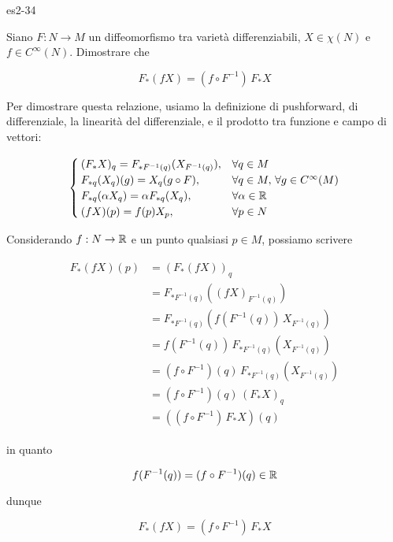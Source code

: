 {es2-34}
{
Siano $ F : N \to M $ un diffeomorfismo tra varietà differenziabili, $ X \in \chi(N) $ e $ f \in C^{\infty}(N) $. Dimostrare che

\begin{equation}
	F_{*}(f X) = (f \circ F^{-1}) \, F_{*} X
\end{equation}
}
{
Per dimostrare questa relazione, usiamo la definizione di pushforward, di differenziale, la linearità del differenziale, e il prodotto tra funzione e campo di vettori:

\begin{equation}
	\begin{cases}
		(F_{*} X)_{q} = F_{*F^{-1}(q)} (X_{F^{-1}(q)}), & \forall q \in M \\
		F_{*q} (X_{q}) (g) = X_{q} (g \circ F), & \forall q \in M, \, \forall g \in C^{\infty}(M) \\
		F_{*q} (\alpha X_{q}) = \alpha F_{*q} (X_{q}), & \forall \alpha \in \mathbb{R} \\
		(f X)(p) = f(p) X_{p}, & \forall p \in N 
	\end{cases}
\end{equation}

Considerando $ f : N \to \mathbb{R} $ e un punto qualsiasi $ p \in M $, possiamo scrivere

\begin{align}
	\begin{split}
		F_{*}(f X)(p) &= (F_{*}(f X))_{q} \\
		&= F_{*F^{-1}(q)} ((f X)_{F^{-1}(q)}) \\
		&= F_{*F^{-1}(q)} (f(F^{-1}(q)) \, X_{F^{-1}(q)}) \\
		&= f(F^{-1}(q)) \, F_{*F^{-1}(q)} (X_{F^{-1}(q)}) \\
		&= (f \circ F^{-1})(q) \, F_{*F^{-1}(q)} (X_{F^{-1}(q)}) \\
		&= (f \circ F^{-1})(q) \, (F_{*} X)_{q} \\
		&= ((f \circ F^{-1}) \, F_{*} X)(q)
	\end{split}
\end{align}

in quanto

\begin{equation}
	f(F^{-1}(q)) = (f \circ F^{-1})(q) \in \mathbb{R}
\end{equation}

dunque

\begin{equation}
	F_{*}(f X) = (f \circ F^{-1}) \, F_{*} X
\end{equation}
}
